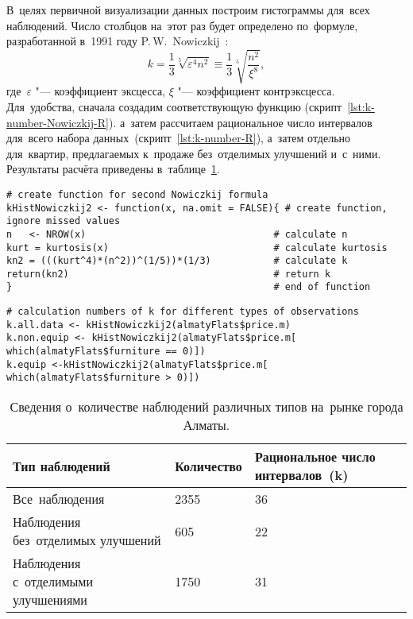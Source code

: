 \documentclass[]{scrreprt}
\begin{document}
В~целях первичной визуализации данных построим гистограммы для~всех наблюдений. Число столбцов на~этот раз будет определено по~формуле, разработанной в~1991 году P.\,W.~Nowiczkij~\cite{Nowiczkij:oczenka-pogresh}:
\begin{equation}\label{eq:k-hist_Nowiczkij}
k = \frac{1}{3}\sqrt[5]{\varepsilon^4 n^2} \equiv \frac{1}{3} \sqrt[5]{\frac{n^2}{\xi^8}}, 
\end{equation}
где~$\varepsilon$ "--- коэффициент эксцесса, $\xi$ "--- коэффициент контрэксцесса. Для~удобства, сначала создадим соответствующую функцию (скрипт~\ref{lst:k-number-Nowiczkij-R}). а~затем рассчитаем рациональное число интервалов для~всего набора данных~(скрипт~\ref{lst:k-number-R}), а~затем отдельно для~квартир, предлагаемых к~продаже без~отделимых улучшений и~с~ними. Результаты расчёта приведены в~таблице~\ref{tab:numbers-of-observations-almaty-R}.
%
\begin{lstlisting}[float, caption = Создание функции для~расчёта~k по~формуле P.\,W.~Nowiczkij, firstnumber=1, label= lst:k-number-Nowiczkij-R]
# create function for second Nowiczkij formula
kHistNowiczkij2 <- function(x, na.omit = FALSE){ # create function, ignore missed values
n   <- NROW(x)                                 # calculate n
kurt = kurtosis(x)                             # calculate kurtosis
kn2 = (((kurt^4)*(n^2))^(1/5))*(1/3)           # calculate k
return(kn2)                                    # return k  
}                                              # end of function
\end{lstlisting} 
%
\begin{lstlisting}[float, caption = Расчёт~k по~формуле P.\,W.~Nowiczkij для~наблюдений различных типов, firstnumber=1, label= lst:k-number-R]
# calculation numbers of k for different types of observations
k.all.data <- kHistNowiczkij2(almatyFlats$price.m)
k.non.equip <- kHistNowiczkij2(almatyFlats$price.m[ which(almatyFlats$furniture == 0)])
k.equip <-kHistNowiczkij2(almatyFlats$price.m[ which(almatyFlats$furniture > 0)])                                       
\end{lstlisting}
%
\begin{table}[ht]
	\caption{Сведения о~количестве наблюдений различных типов на~рынке города Алматы.}\label{tab:numbers-of-observations-almaty-R}
	\centering
	\begin{tabular}{lll}
		\hline
		Тип наблюдений&Количество&Рациональное число интервалов~(k)\\
		\hline
		Все~наблюдения&2355&36\\
		\hline
		Наблюдения без~отделимых улучшений&605&22\\
		\hline
		Наблюдения с~отделимыми улучшениями&1750&31\\
		\hline
	\end{tabular}
\end{table}
%
\end{document}
